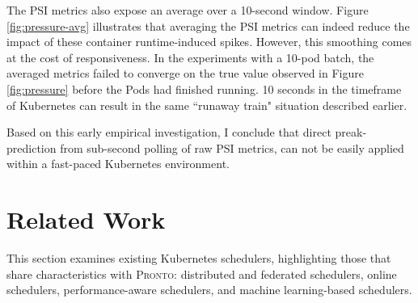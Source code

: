 The PSI metrics also expose an average over a 10-second window. Figure
\ref{fig:pressure-avg} illustrates that averaging the PSI metrics can indeed
reduce the impact of these container runtime-induced spikes. However, this
smoothing comes at the cost of responsiveness. In the experiments with a 10-pod
batch, the averaged metrics failed to converge on the true value observed in
Figure \ref{fig:pressure} before the Pods had finished running. 10 seconds in
the timeframe of Kubernetes can result in the same ``runaway train" situation
described earlier.

Based on this early empirical investigation, I conclude that direct
preak-prediction from sub-second polling of raw PSI metrics, can not be easily
applied within a fast-paced Kubernetes environment.


%
%
%


\section{Related Work}
This section examines existing Kubernetes schedulers, highlighting
those that share characteristics with \textsc{Pronto}: distributed and federated
schedulers, online schedulers, performance-aware schedulers, and machine
learning-based schedulers.

